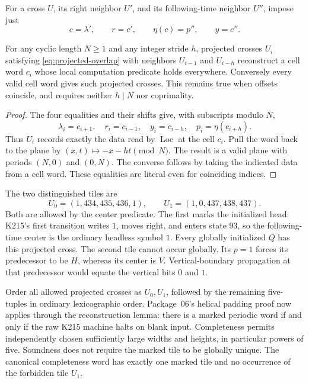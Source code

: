 For a cross $U$, its right neighbor $U'$, and its following-time
neighbor $U''$, impose just
\begin{equation}
 c=\lambda',\qquad r=c',\qquad
 \eta(c)=p'',\qquad y=c''.
 \label{eq:projected-overlap}
\end{equation}

\begin{lemma}
For any cyclic length $N\ge1$ and any integer stride $h$, projected crosses
$U_i$ satisfying \eqref{eq:projected-overlap} with neighbors
$U_{i-1}$ and $U_{i-h}$ reconstruct a cell word $c_i$ whose local
computation predicate holds everywhere.  Conversely every valid cell
word gives such projected crosses.  This remains true when offsets
coincide, and requires neither $h\mid N$ nor coprimality.
\end{lemma}
\begin{proof}
The four equalities and their shifts give, with subscripts modulo $N$,
\[
 \lambda_i=c_{i+1},\quad r_i=c_{i-1},\quad
 y_i=c_{i-h},\quad p_i=\eta(c_{i+h}).
\]
Thus $U_i$ records exactly the data read by $\operatorname{Loc}$ at the
cell $c_i$.  Pull the word back to the plane by
$(x,t)\mapsto-x-ht\pmod N$.  The result is a valid plane with periods
$(N,0)$ and $(0,N)$.  The converse follows by taking the indicated data
from a cell word.  These equalities are literal even for coinciding
indices.
\end{proof}

The two distinguished tiles are
\[
 U_0=(1,434,435,436,1),\qquad
 U_1=(1,0,437,438,437).
\]
Both are allowed by the center predicate.  The first marks the initialized
head: K215's first transition writes $1$, moves right, and enters state
$93$, so the following-time center is the ordinary headless symbol $1$.
Every globally initialized $Q$ has this projected cross.  The second
tile cannot occur globally.  Its $p=1$ forces its predecessor to be $H$,
whereas its center is $V$.  Vertical-boundary propagation at that
predecessor would equate the vertical bits $0$ and $1$.

Order all allowed projected crosses as $U_0,U_1$, followed by the remaining
five-tuples in ordinary lexicographic order.  Package~06's helical padding
proof now applies through the reconstruction lemma: there is a marked
periodic word if and only if the raw K215 machine halts on blank input.
Completeness permits independently chosen sufficiently large widths and
heights, in particular powers of five.  Soundness does not require the
marked tile to be globally unique.  The canonical completeness word has
exactly one marked tile and no occurrence of the forbidden tile $U_1$.

